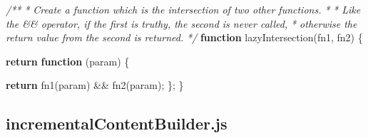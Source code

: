 \documentclass[]{article}
\newenvironment{Shaded}{}{}
\newcommand{\KeywordTok}[1]{\textcolor[rgb]{0.00,0.44,0.13}{\textbf{{#1}}}}
\newcommand{\CommentTok}[1]{\textcolor[rgb]{0.38,0.63,0.69}{\textit{{#1}}}}
\newcommand{\FunctionTok}[1]{\textcolor[rgb]{0.02,0.16,0.49}{{#1}}}
\newcommand{\NormalTok}[1]{{#1}}
\begin{document}
\begin{Shaded}
\begin{Highlighting}[]
\CommentTok{/**}
\CommentTok{ * Create a function which is the intersection of two other functions.}
\CommentTok{ * }
\CommentTok{ * Like the && operator, if the first is truthy, the second is never called,}
\CommentTok{ * otherwise the return value from the second is returned.}
\CommentTok{ */}
\KeywordTok{function} \FunctionTok{lazyIntersection}\NormalTok{(fn1, fn2) \{}

   \KeywordTok{return} \KeywordTok{function} \NormalTok{(param) \{}
                                                              
      \KeywordTok{return} \FunctionTok{fn1}\NormalTok{(param) && }\FunctionTok{fn2}\NormalTok{(param);}
   \NormalTok{\};   }
\NormalTok{\}}

\end{Highlighting}
\end{Shaded}

\pagebreak

\subsection{incrementalContentBuilder.js}

\label{src_incrementalContentBuilder}
\end{document}
